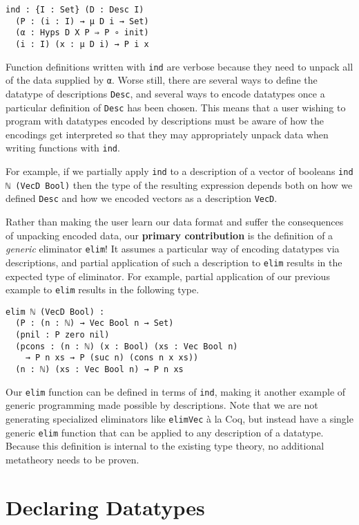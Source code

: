 \documentclass[preprint,nonatbib]{sigplanconf}
\begin{document}
\begin{verbatim}
ind : {I : Set} (D : Desc I)
  (P : (i : I) → μ D i → Set)
  (α : Hyps D X P ⇒ P ∘ init)
  (i : I) (x : μ D i) → P i x
\end{verbatim}

Function definitions written with {\tt ind} are verbose
because they need to unpack all of the data supplied by {\tt α}.
Worse still, there are several ways to define the datatype of
descriptions {\tt Desc}, and several ways to encode datatypes once a
particular definition of {\tt Desc} has been chosen. This means that a
user wishing to program with datatypes encoded by descriptions must be
aware of how the encodings get interpreted so that they may
appropriately unpack data when writing functions with {\tt ind}.

For example, if we partially apply {\tt ind} to a description of a
vector of booleans {\tt ind ℕ (VecD Bool)} then the type of the
resulting expression depends both on how we defined {\tt Desc} and how
we encoded vectors as a description {\tt VecD}.

Rather than making the user learn our data format and suffer the
consequences of unpacking encoded data, our {\bf primary contribution} is
the definition of a {\it generic} eliminator {\tt elim}!
It assumes a particular way of encoding
datatypes via descriptions, and partial application of such a
description to {\tt elim} results in the expected type of eliminator.
For example, partial application of our previous example to
{\tt elim} results in the following type.

\begin{verbatim}
elim ℕ (VecD Bool) :
  (P : (n : ℕ) → Vec Bool n → Set)
  (pnil : P zero nil)
  (pcons : (n : ℕ) (x : Bool) (xs : Vec Bool n)
    → P n xs → P (suc n) (cons n x xs))
  (n : ℕ) (xs : Vec Bool n) → P n xs
\end{verbatim}

Our {\tt elim} function can be defined in terms of
{\tt ind}, making it another example of generic programming made
possible by descriptions.
Note that we are not generating specialized eliminators like
{\tt elimVec} à la {\sc Coq}, but instead have a single generic
{\tt elim} function that can be applied to any description of a
datatype.
Because this definition is internal to the
existing type theory, no additional metatheory needs to be proven.


\section{Declaring Datatypes}
\label{sec:background}
\end{document}
